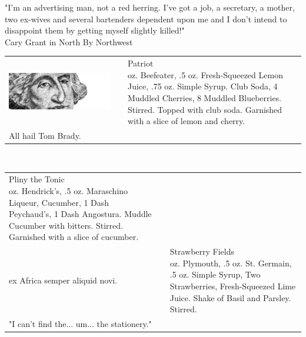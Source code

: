 \documentclass{article}
\makeatletter
\newcommand \Dotfill {\leavevmode \cleaders \hb@xt@ .25em{\hss .\hss }\hfill \kern \z@}%
\makeatother
\begin{document}
{{\Large\centering "I'm an advertising man, not a red herring. I've got a job, a secretary, a mother, two ex-wives and several bartenders dependent upon me and I don't intend to disappoint them by getting myself slightly killed!" \\[1pt] \large Cary Grant in North By Northwest}
\makebox[\columnwidth]{\Huge\Dotfill}\\


\begin{tabular}{m{}m{}m{}}
\includegraphics[scale=1]{patriot.png}
&
&
{\centering\Huge{Patriot}\\*}
\centering 1.5 oz. Beefeater, .5 oz. Fresh-Squeezed Lemon Juice, .75 oz. Simple Syrup. Club Soda, 4 Muddled Cherries, 8 Muddled Blueberries. Stirred. Topped with club soda. Garnished with a slice of lemon and cherry.\\
\centering\small{All hail Tom Brady.}
\end{tabular}\\[-4pt]
\makebox[\columnwidth]{\Huge\Dotfill}

\begin{tabular}{m{}m{}m{}}
{\centering\Huge{Pliny the Tonic}\\*}
\centering 2 oz. Hendrick's, .5 oz. Maraschino Liqueur, Cucumber, 1 Dash Peychaud's, 1 Dash Angostura. Muddle Cucumber with bitters. Stirred. Garnished with a slice of cucumber.\\
\centering\small{ex Africa semper aliquid novi.}
&
&
{\centering\Huge{Strawberry Fields}\\*}
\centering 2 oz. Plymouth, .5 oz. St. Germain, .5 oz. Simple Syrup, Two Strawberries, Fresh-Squeezed Lime Juice. Shake of Basil and Parsley. Stirred.\\
\centering\small{"I can't find the... um... the stationery."}
\end{tabular}
\\\makebox[\columnwidth]{\Huge\Dotfill}

}
\end{document}
